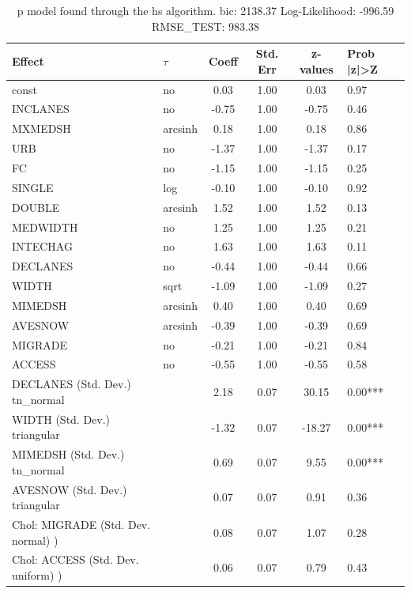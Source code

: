 \begin{table}
	\caption{p model found through the hs algorithm. bic: 2138.37 Log-Likelihood: -996.59 RMSE_TEST: 983.38}
	\begin{center}
		\begin{tabular}{|l|l|c|c|c|l|}
			\hline
			Effect & $\tau$ & Coeff & Std. Err & z-values & Prob |z|>Z \\
			\hline
			const & no & 0.03 & 1.00 & 0.03 & 0.97 \\
			\hline
			INCLANES & no & -0.75 & 1.00 & -0.75 & 0.46 \\
			\hline
			MXMEDSH & arcsinh & 0.18 & 1.00 & 0.18 & 0.86 \\
			\hline
			URB & no & -1.37 & 1.00 & -1.37 & 0.17 \\
			\hline
			FC & no & -1.15 & 1.00 & -1.15 & 0.25 \\
			\hline
			SINGLE & log & -0.10 & 1.00 & -0.10 & 0.92 \\
			\hline
			DOUBLE & arcsinh & 1.52 & 1.00 & 1.52 & 0.13 \\
			\hline
			MEDWIDTH & no & 1.25 & 1.00 & 1.25 & 0.21 \\
			\hline
			INTECHAG & no & 1.63 & 1.00 & 1.63 & 0.11 \\
			\hline
			DECLANES & no & -0.44 & 1.00 & -0.44 & 0.66 \\
			\hline
			WIDTH & sqrt & -1.09 & 1.00 & -1.09 & 0.27 \\
			\hline
			MIMEDSH & arcsinh & 0.40 & 1.00 & 0.40 & 0.69 \\
			\hline
			AVESNOW & arcsinh & -0.39 & 1.00 & -0.39 & 0.69 \\
			\hline
			MIGRADE & no & -0.21 & 1.00 & -0.21 & 0.84 \\
			\hline
			ACCESS & no & -0.55 & 1.00 & -0.55 & 0.58 \\
			\hline
			DECLANES (Std. Dev.) tn_normal &  & 2.18 & 0.07 & 30.15 & 0.00*** \\
			\hline
			WIDTH (Std. Dev.) triangular &  & -1.32 & 0.07 & -18.27 & 0.00*** \\
			\hline
			MIMEDSH (Std. Dev.) tn_normal &  & 0.69 & 0.07 & 9.55 & 0.00*** \\
			\hline
			AVESNOW (Std. Dev.) triangular &  & 0.07 & 0.07 & 0.91 & 0.36 \\
			\hline
			 Chol: MIGRADE (Std. Dev. normal) ) &  & 0.08 & 0.07 & 1.07 & 0.28 \\
			\hline
			 Chol: ACCESS (Std. Dev. uniform) ) &  & 0.06 & 0.07 & 0.79 & 0.43 \\

\end{tabular}
\end{center}
\end{table}

